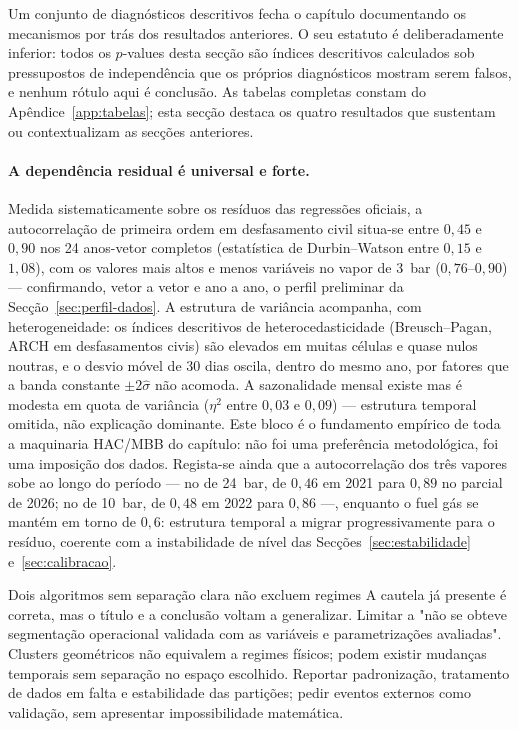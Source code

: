 
Um conjunto de diagnósticos descritivos fecha o capítulo documentando os
mecanismos por trás dos resultados anteriores. O seu estatuto é
deliberadamente inferior: todos os $p$-values desta secção são índices
descritivos calculados sob pressupostos de independência que os próprios
diagnósticos mostram serem falsos, e nenhum rótulo aqui é conclusão. As tabelas completas constam do Apêndice~\ref{app:tabelas};
esta secção destaca os quatro resultados que sustentam ou contextualizam as
secções anteriores.

\paragraph{A dependência residual é universal e forte.} Medida
sistematicamente sobre os resíduos das regressões oficiais, a autocorrelação
de primeira ordem em desfasamento civil situa-se entre $0{,}45$ e $0{,}90$
nos 24 anos-vetor completos (estatística de Durbin--Watson entre $0{,}15$ e
$1{,}08$), com os valores mais altos e menos variáveis no vapor de 3~bar
($0{,}76$--$0{,}90$) --- confirmando, vetor a vetor e ano a ano, o perfil
preliminar da Secção~\ref{sec:perfil-dados}. A estrutura de variância acompanha,
com heterogeneidade: os índices descritivos de heterocedasticidade
(Breusch--Pagan, ARCH em desfasamentos civis) são elevados em muitas células
e quase nulos noutras, e o desvio móvel de 30 dias oscila, dentro do mesmo
ano, por fatores que a banda constante $\pm 2\hat\sigma$ não acomoda. A sazonalidade mensal existe mas é
modesta em quota de variância ($\eta^2$ entre $0{,}03$ e $0{,}09$) ---
estrutura temporal omitida, não explicação dominante. Este bloco é o
fundamento empírico de toda a maquinaria HAC/MBB do capítulo: não foi uma
preferência metodológica, foi uma imposição dos dados. Regista-se ainda que
a autocorrelação dos três vapores sobe ao longo do período --- no de
24~bar, de $0{,}46$ em 2021 para $0{,}89$ no parcial de 2026; no de 10~bar,
de $0{,}48$ em 2022 para $0{,}86$ ---, enquanto o fuel gás se mantém em
torno de $0{,}6$: estrutura temporal a migrar progressivamente para o
resíduo, coerente com a instabilidade de nível das
Secções~\ref{sec:estabilidade} e~\ref{sec:calibracao}.

{Dois algoritmos sem separação clara não excluem regimes}
{A cautela já presente é correta, mas o título e a conclusão voltam a
generalizar. Limitar a "não se obteve segmentação operacional validada
com as variáveis e parametrizações avaliadas". Clusters geométricos não
equivalem a regimes físicos; podem existir mudanças temporais sem
separação no espaço escolhido. Reportar padronização, tratamento de
dados em falta e estabilidade das partições; pedir eventos externos
como validação, sem apresentar impossibilidade matemática.}%
